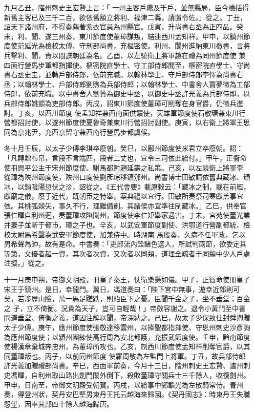 \begin{pinyinscope}
 九月乙丑，階州刺史王宏贄上言：「
 一州主客戶纔及千戶，並無縣局，臣今檢括得新舊主客已及三千二百，欲依舊額立將利、福津二縣，請置令佐。」從之。丁丑，詔天下諸州府，不得奏薦著紫衣官員為州縣官。戊寅，升尚書右丞為正四品。癸未，利、閬、遂三州奏，東川節度使董璋謀叛，結連西川孟知祥。甲申，以鎮州節度使范延光為檢校太傅、守刑部尚書，充樞密使。利州、閬州進納東川檄書，言將兵擊利、閬，責以間諜朝廷為名。乙酉，以左驍衛上將軍趙在禮為同州節度使
 兼四面行營馬步軍都指揮使。樞密院直學士、守工部侍郎閻至，樞密院直學士、守尚書右丞史圭，並轉戶部侍郎，依前充職。以翰林學士、守戶部侍郎李懌為尚書右丞；以翰林學士、戶部侍郎劉煦為兵部侍郎；以翰林學士、中書舍人竇夢徵為工部侍郎，依前充職。以中書舍人劉贊為御史中丞，以御史中丞許光義為兵部侍即，以兵部侍郎姚顗為吏部侍郎。丙戌，詔東川節度使董璋可削奪在身官爵，仍徵兵進討。丁亥，以西川節度
 使孟知祥兼西南面供饋使，天雄軍節度使石敬瑭兼東川行營都招討使，以遂州節度使夏魯奇兼東川行營招討副使。庚寅，以右衛上將軍王思同為京兆尹，充西京留守兼西南行營馬步都虞候。



 冬十月壬辰，以太子少傅李琪卒廢朝。癸巳，以鄜州節度使米君立卒廢朝。詔：「凡賻贈布帛，言段不言端匹，段者二丈也，宜令三司依此給付。」甲午，正衙命使冊興平公主于宋州節度使、駙馬都尉趙延壽之私第。己亥，以左驍衛上將軍李
 從璋為陜州節度使，陜州口度使劉彥琮移鎮邠州。尚書博士田敏請依舊典藏冰、頒冰，以銷陰陽愆伏之沴，詔從之。《五代會要》載原敕云：「藏冰之制，載在前經，獻廟之儀，廢于近代，既朝臣之特舉，案典禮以宜行。田敏所奏祭司寒獻羔事宜依。其桃弧棘矢，事久不行，理難備創。其諸侯亦宜準往制藏冰。」乙巳，供奉官張仁暉自利州迴，奏董璋攻陷閬州，節度使李仁矩舉家遇害。丁未，宮苑使董光業并妻子並斬于都市，璋之子也。辛亥，以武安軍節度副使、洪鄂道行營副都統、檢校太尉馬希聲為武安軍節度使，加兼侍中。時湖南
 馬殷奏，久病不任軍政，乞以男希聲為帥，故有是命。中書奏：「吏部流內銓諸色選人，所試判兩節，欲委定其等第，文優者超一資，其次者次資，又次者以同類，道理全疏者于同類中少人戶處注擬。」從之。



 十一月庚申朔，帝御文明殿，冊皇子秦王，仗衛樂懸如儀。甲子，正衙命使冊皇子宋王于鎮州。是日，幸龍門。翼日，馮道奏曰：「陛下宮中無事，遊幸近郊則可矣，若涉歷山險，萬一馬足蹉跌，則貽臣下之憂。臣聞千金之子，坐不垂堂；百金之
 子，立不倚衡。況貴為天子，豈可自輕哉！」帝斂容謝之。退令小黃門至中書問道垂堂、倚衡之義，道因注解以聞，帝深納之。己巳，故太子少保致仕封舜卿贈太子少傅。庚午，應州節度使張敬達移雲州，以捧聖都指揮使、守恩州刺史沙彥詢為應州節度使；以潁州團練使高行周為安北都護，充振武節度使。壬申，黔南節度使楊漢章棄城奔忠州，為董璋所攻也。乙亥，制西川節度使孟知祥削奪官爵，以其同董璋叛也。丙子，以前同州節度
 使羅周敬為左監門上將軍。丁丑，故兵部侍郎許光義加贈禮部尚書。辛巳，西面軍前奏，今月十三日，階州刺史王宏贄、瀘州刺史馮暉，自利州取山路出劍門關外倒下，殺敗董璋守關兵士三千餘人，收復劍州。甲申，日南至，帝御文明殿受朝賀。丙戌，以給事中鄭韜光為左散騎常侍。青州奏，得登州狀，契丹安巴堅男東丹王托云越海來歸國。《契丹國志》：時東丹王失職怨望，因率其部四十餘人越海歸唐。




\end{pinyinscope}
